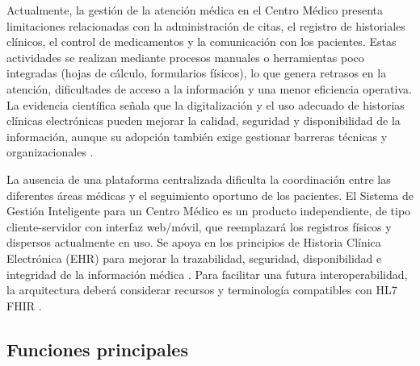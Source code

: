 \documentclass[11pt,a4paper]{article}
\begin{document}
	Actualmente, la gestión de la atención médica en el Centro Médico presenta limitaciones relacionadas con la administración de citas, el registro de historiales clínicos, el control de medicamentos y la comunicación con los pacientes. Estas actividades se realizan mediante procesos manuales o herramientas poco integradas (hojas de cálculo, formularios físicos), lo que genera retrasos en la atención, dificultades de acceso a la información y una menor eficiencia operativa. La evidencia científica señala que la digitalización y el uso adecuado de historias clínicas electrónicas pueden mejorar la calidad, seguridad y disponibilidad de la información, aunque su adopción también exige gestionar barreras técnicas y organizacionales \cite{buntin2011,campanella2016,kruse2016}.
	
	La ausencia de una plataforma centralizada dificulta la coordinación entre las diferentes áreas médicas y el seguimiento oportuno de los pacientes. El Sistema de Gestión Inteligente para un Centro Médico es un producto independiente, de tipo cliente-servidor con interfaz web/móvil, que reemplazará los registros físicos y dispersos actualmente en uso. Se apoya en los principios de Historia Clínica Electrónica (EHR) para mejorar la trazabilidad, seguridad, disponibilidad e integridad de la información médica \cite{hayrinen2008,menachemi2011,gagnon2012}. Para facilitar una futura interoperabilidad, la arquitectura deberá considerar recursos y terminología compatibles con HL7 FHIR \cite{hl7fhir}.
	
	\subsection{Funciones principales}
	
\end{document}
